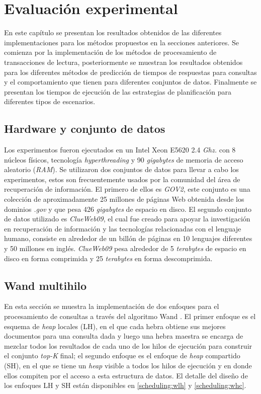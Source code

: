 \chapter{Evaluación experimental}
\label{cap:evaluacionexperimental}
En este capítulo se presentan los resultados obtenidos de las diferentes implementaciones para los métodos propuestos en la secciones anteriores. Se comienza por la implementación de los métodos de procesamiento de transacciones de lectura, posteriormente se muestran los resultados obtenidos para los diferentes métodos de predicción de tiempos de respuestas para consultas y el comportamiento que tienen para diferentes conjuntos de datos. Finalmente se presentan los tiempos de ejecución de las estrategias de planificación para diferentes tipos de escenarios.

\section{Hardware y conjunto de datos}
\label{evaluacionexperimental:hardwareydatos}
Los experimentos fueron ejecutados en un Intel Xeon E5620 2.4 \textit{Ghz.} con 8 núcleos físicos, tecnología \textit{hyperthreading} y 90 \textit{gigabytes} de memoria de acceso aleatorio (\textit{RAM}). Se utilizaron dos conjuntos de datos para llevar a cabo los experimentos, estos son frecuentemente usados por la comunidad del área de recuperación de información. El primero de ellos es \textit{GOV2}, este conjunto es una colección de aproximadamente 25 millones de páginas Web obtenida desde los dominios \textit{.gov} y que pesa 426 \textit{gigabytes} de espacio en disco. El segundo conjunto de datos utilizado es \textit{ClueWeb09}, el cual fue creado para apoyar la investigación en recuperación de información y las tecnologías relacionadas con el lenguaje humano, consiste en alrededor de un billón de páginas en 10 lenguajes diferentes y 50 millones en inglés. \textit{ClueWeb09} pesa alrededor de 5 \textit{terabytes} de espacio en disco en forma comprimida y 25 \textit{terabytes} en forma descomprimida. 

\section{Wand multihilo}
\label{evaluacionexperimental:wm}
En esta sección se muestra la implementación de dos enfoques para el procesamiento de consultas a través del algoritmo Wand \citep{Broder:2003}. El primer enfoque es el esquema de \textit{heap} locales (LH), en el que cada hebra obtiene sus mejores documentos para una consulta dada y luego una hebra maestra se encarga de mezclar todos los resultados de cada uno de los hilos de ejecución para construir el conjunto \textit{top-K} final; el segundo enfoque es el enfoque de \textit{heap} compartido (SH), en el que se tiene un \textit{heap} visible a todos los hilos de ejecución y en donde ellos compiten por el acceso a esta estructura de datos. El detalle del diseño de los enfoques LH y SH están disponibles en \ref{scheduling:wlh} y \ref{scheduling:whc}. 

